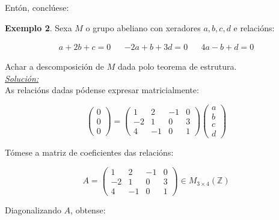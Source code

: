 \documentclass[twoside]{report}
\theoremstyle{mystyle}
\begin{document}
\vspace{3mm}

\noindent Entón, conclúese:

\begin{center}
\end{center}

\pagebreak

\noindent \textbf{Exemplo 2}. Sexa $M$ o grupo abeliano con xeradores $a,b,c,d$ e relacións:

\begin{align*}
    a + 2b + c = 0 & & -2a + b + 3d = 0 & & 4a - b + d = 0
\end{align*}

\vspace{3mm}

\noindent Achar a descomposición de $M$ dada polo teorema de estrutura.\\

\noindent \textit{\underline{Solución:}}\\

\noindent As relacións dadas pódense expresar matricialmente:

$$
\begin{pmatrix}
0 \\ 0 \\ 0
\end{pmatrix}
= 
\begin{pmatrix}
1 & 2 & -1 & 0\\
-2 & 1 & 0 & 3\\
4 & -1 & 0 & 1 
\end{pmatrix}
\begin{pmatrix}
a \\ b \\ c \\ d
\end{pmatrix}
$$

\noindent Tómese a matriz de coeficientes das relacións:

$$
A = 
\begin{pmatrix}
1 & 2 & -1 & 0\\
-2 & 1 & 0 & 3\\
4 & -1 & 0 & 1 
\end{pmatrix}
\in M_{3 \times 4}(\mathbb{Z})
$$

\noindent Diagonalizando $A$, obtense:
\end{document}
